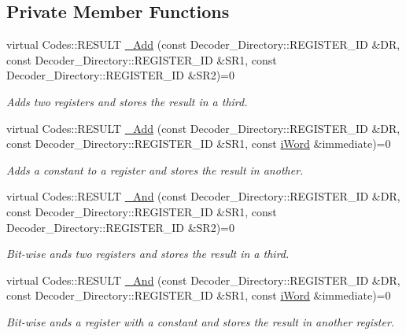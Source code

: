 \subsection*{Private Member Functions}
\begin{DoxyCompactItemize}
\item 
virtual Codes::RESULT \hyperlink{classiWi11_a45ebe6e8d33dbc94bfbec0aef22dae6a}{\_\-Add} (const Decoder\_\-Directory::REGISTER\_\-ID \&DR, const Decoder\_\-Directory::REGISTER\_\-ID \&SR1, const Decoder\_\-Directory::REGISTER\_\-ID \&SR2)=0
\begin{DoxyCompactList}\small\item\em Adds two registers and stores the result in a third. \item\end{DoxyCompactList}\item 
virtual Codes::RESULT \hyperlink{classiWi11_aee7d9647106b62eae74b6eeb29d0ab2d}{\_\-Add} (const Decoder\_\-Directory::REGISTER\_\-ID \&DR, const Decoder\_\-Directory::REGISTER\_\-ID \&SR1, const \hyperlink{classiWord}{iWord} \&immediate)=0
\begin{DoxyCompactList}\small\item\em Adds a constant to a register and stores the result in another. \item\end{DoxyCompactList}\item 
virtual Codes::RESULT \hyperlink{classiWi11_a6d18d19f9f93dcfeded98a13449de64b}{\_\-And} (const Decoder\_\-Directory::REGISTER\_\-ID \&DR, const Decoder\_\-Directory::REGISTER\_\-ID \&SR1, const Decoder\_\-Directory::REGISTER\_\-ID \&SR2)=0
\begin{DoxyCompactList}\small\item\em Bit-\/wise ands two registers and stores the result in a third. \item\end{DoxyCompactList}\item 
virtual Codes::RESULT \hyperlink{classiWi11_a4344763aa4efa0d384c9228b4b85e205}{\_\-And} (const Decoder\_\-Directory::REGISTER\_\-ID \&DR, const Decoder\_\-Directory::REGISTER\_\-ID \&SR1, const \hyperlink{classiWord}{iWord} \&immediate)=0
\begin{DoxyCompactList}\small\item\em Bit-\/wise ands a register with a constant and stores the result in another register. \item\end{DoxyCompactList}\item 

\end{DoxyCompactItemize}
